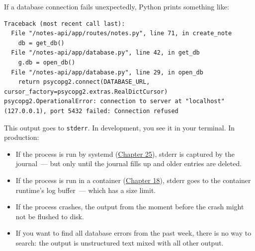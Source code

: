 \begin{codebox}[short]

\begin{Shaded}
\begin{Highlighting}[]
\NormalTok{(}\OperatorTok{=}\NormalTok{[}\NormalTok{])}
\OperatorTok{=}\OperatorTok{=}\NormalTok{)}
      \NormalTok{):}
        \NormalTok{: }\NormalTok{\}), }
\end{Highlighting}
\end{Shaded}

\end{codebox}

\noindent{}If a database connection fails unexpectedly, Python prints something like:

\begin{outputbox}[short]
\begin{Verbatim}[fontsize=\codesize, breaklines, breakanywhere, breaksymbolleft={\tiny\textcolor{muted}{$\hookrightarrow$}}]
Traceback (most recent call last):
  File "/notes-api/app/routes/notes.py", line 71, in create_note
    db = get_db()
  File "/notes-api/app/database.py", line 42, in get_db
    g.db = open_db()
  File "/notes-api/app/database.py", line 29, in open_db
    return psycopg2.connect(DATABASE_URL, cursor_factory=psycopg2.extras.RealDictCursor)
psycopg2.OperationalError: connection to server at "localhost" (127.0.0.1), port 5432 failed: Connection refused
\end{Verbatim}
\end{outputbox}

\noindent{}This output goes to \texttt{stderr}. In development, you see it in your terminal. In production:

\begin{itemize}
\tightlist
\item
  If the process is run by systemd (\hyperref[ch:25-process-management]{Chapter 25}), stderr is captured by the journal~--- but only until the journal fills up and older entries are deleted.
\item
  If the process is run in a container (\hyperref[ch:18-containerization]{Chapter 18}), stderr goes to the container runtime's log buffer~--- which has a size limit.
\item
  If the process crashes, the output from the moment before the crash might not be flushed to disk.
\item
  If you want to find all database errors from the past week, there is no way to search: the output is unstructured text mixed with all other output.
\end{itemize}

